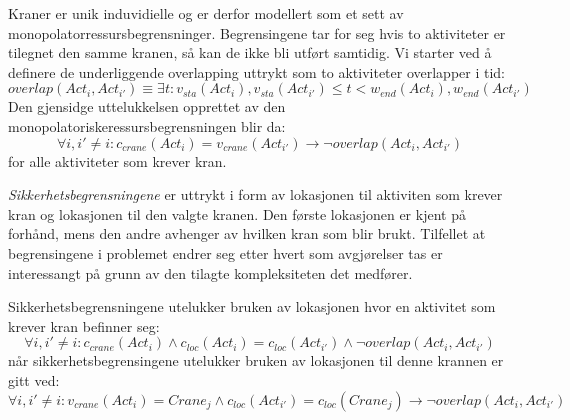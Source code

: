 Kraner er unik induvidielle og er derfor modellert som et sett av monopolatorressursbegrensninger. Begrensingene tar for seg hvis to aktiviteter er tilegnet den samme kranen, så kan de ikke bli utført samtidig. Vi starter ved å definere de underliggende overlapping uttrykt som to aktiviteter overlapper i tid: 
\begin{equation}
overlap(Act_{i},Act_{i'}) \equiv \exists t : v_{sta}(Act_{i}),v_{sta}(Act_{i'}) \leq t < w_{end}(Act_{i}),w_{end}(Act_{i'})
\end{equation}
Den gjensidge uttelukkelsen opprettet av den monopolatoriskeressursbegrensningen blir da: 
\begin{equation}
\forall i,i' \neq i : c_{crane}(Act_{i}) = v_{crane}(Act_{i'}) \rightarrow \neg overlap(Act_{i},Act_{i'})
\end{equation}
for alle aktiviteter som krever kran.

\textit{Sikkerhetsbegrensningene} er uttrykt i form av lokasjonen til aktiviten som krever kran og lokasjonen til den valgte kranen. Den første lokasjonen er kjent på forhånd, mens den andre avhenger av hvilken kran som blir brukt. Tilfellet at begrensingene i problemet endrer seg etter hvert som avgjørelser tas er interessangt på grunn av den tilagte kompleksiteten det medfører.

Sikkerhetsbegrensningene utelukker bruken av lokasjonen hvor en aktivitet som krever kran befinner seg:
\begin{equation}
\forall i,i' \neq i : c_{crane}(Act_{i}) \wedge c_{loc}(Act_{i}) = c_{loc}(Act_{i'}) \wedge \neg overlap(Act_{i},Act_{i'})
\end{equation}
når sikkerhetsbegrensingene utelukker bruken av lokasjonen til denne krannen er gitt ved:
\begin{equation}
\forall i,i' \neq i : v_{crane}(Act_{i}) = Crane_{j} \wedge c_{loc}(Act_{i'}) = c_{loc}(Crane_{j}) \rightarrow \neg overlap(Act_{i},Act_{i'})
\end{equation}

